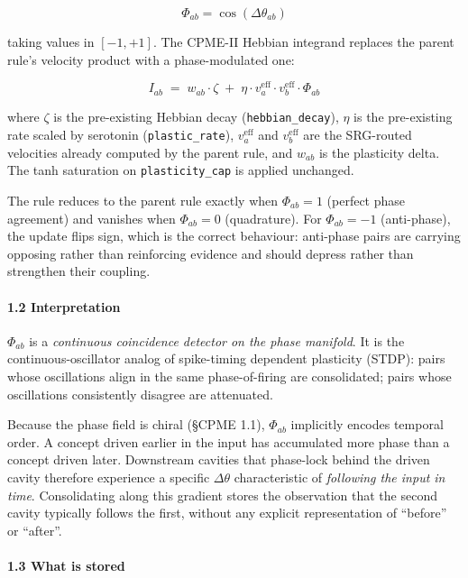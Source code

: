\documentclass[
  11pt,
  a4paper,
]{article}
\begin{document}
\[
\Phi_{ab} = \cos(\Delta \theta_{ab})
\]

taking values in \([-1, +1]\). The CPME-II Hebbian integrand replaces
the parent rule's velocity product with a phase-modulated one:

\[
I_{ab} \;=\; w_{ab} \cdot \zeta \;+\; \eta \cdot v_a^{\text{eff}} \cdot v_b^{\text{eff}} \cdot \Phi_{ab}
\]

where \(\zeta\) is the pre-existing Hebbian decay
(\texttt{hebbian\_decay}), \(\eta\) is the pre-existing rate scaled by
serotonin (\texttt{plastic\_rate}), \(v_a^{\text{eff}}\) and
\(v_b^{\text{eff}}\) are the SRG-routed velocities already computed by
the parent rule, and \(w_{ab}\) is the plasticity delta. The tanh
saturation on \texttt{plasticity\_cap} is applied unchanged.

The rule reduces to the parent rule exactly when \(\Phi_{ab} = 1\)
(perfect phase agreement) and vanishes when \(\Phi_{ab} = 0\)
(quadrature). For \(\Phi_{ab} = -1\) (anti-phase), the update flips
sign, which is the correct behaviour: anti-phase pairs are carrying
opposing rather than reinforcing evidence and should depress rather than
strengthen their coupling.

\paragraph{1.2 Interpretation}\label{interpretation}

\(\Phi_{ab}\) is a \emph{continuous coincidence detector on the phase
manifold}. It is the continuous-oscillator analog of spike-timing
dependent plasticity (STDP): pairs whose oscillations align in the same
phase-of-firing are consolidated; pairs whose oscillations consistently
disagree are attenuated.

Because the phase field is chiral (§CPME 1.1), \(\Phi_{ab}\) implicitly
encodes temporal order. A concept driven earlier in the input has
accumulated more phase than a concept driven later. Downstream cavities
that phase-lock behind the driven cavity therefore experience a specific
\(\Delta \theta\) characteristic of \emph{following the input in time}.
Consolidating along this gradient stores the observation that the second
cavity typically follows the first, without any explicit representation
of ``before'' or ``after''.

\paragraph{1.3 What is stored}\label{what-is-stored}
\end{document}
